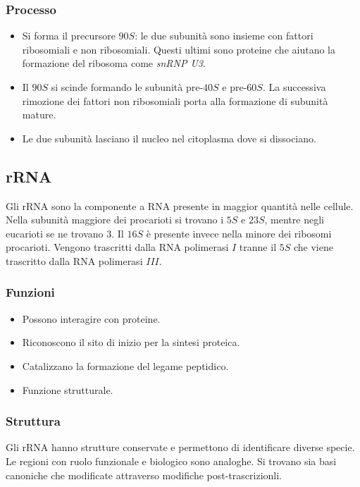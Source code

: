 		\subsubsection{Processo}
		\begin{multicols}{2}
			\begin{itemize}
				\item Si forma il precursore $90S$: le due subunit\`a sono insieme con fattori ribosomiali e non ribosomiali.
					Questi ultimi sono proteine che aiutano la formazione del ribosoma come \emph{snRNP U3}.
				\item Il $90S$ si scinde formando le subunit\`a pre-$40S$ e pre-$60S$.
					La successiva rimozione dei fattori non ribosomiali porta alla formazione di subunit\`a mature.
				\item Le due subunit\`a lasciano il nucleo nel citoplasma dove si dissociano.
			\end{itemize}
		\end{multicols}

	\subsection{rRNA}
	Gli rRNA sono la componente a RNA presente in maggior quantit\`a nelle cellule.
	Nella subunit\`a maggiore dei procarioti si trovano i $5S$ e $23S$, mentre negli eucarioti se ne trovano $3$.
	Il $16S$ \`e presente invece nella minore dei ribosomi procarioti.
	Vengono trascritti dalla RNA polimerasi $I$ tranne il $5S$ che viene trascritto dalla RNA polimerasi $III$.

		\subsubsection{Funzioni}
		\begin{multicols}{2}
			\begin{itemize}
				\item Possono interagire con proteine.
				\item Riconoscono il sito di inizio per la sintesi proteica.
				\item Catalizzano la formazione del legame peptidico.
				\item Funzione strutturale.
			\end{itemize}
		\end{multicols}

		\subsubsection{Struttura}
		Gli rRNA hanno strutture conservate e permettono di identificare diverse specie.
		Le regioni con ruolo funzionale e biologico sono analoghe.
		Si trovano sia basi canoniche che modificate attraverso modifiche post-trascrizionli.

